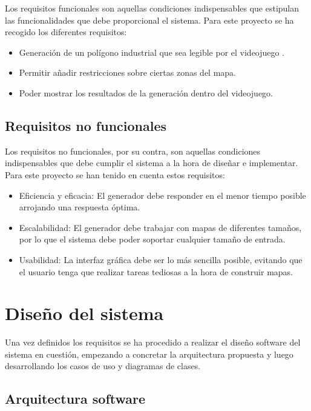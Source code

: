 Los requisitos funcionales son aquellas condiciones indispensables que estipulan las funcionalidades que debe proporcional el sistema. Para este proyecto se ha recogido los diferentes requisitos:

\begin{itemize}
	\item Generación de un polígono industrial que sea legible por el videojuego \cities.
	\item Permitir añadir restricciones sobre ciertas zonas del mapa.
	\item Poder mostrar los resultados de la generación dentro del videojuego.
\end{itemize}

\subsection{Requisitos no funcionales}

Los requisitos no funcionales, por su contra, son aquellas condiciones indispensables que debe cumplir el sistema a la hora de diseñar e implementar. Para este proyecto se han tenido en cuenta estos requisitos:

\begin{itemize}
	\item Eficiencia y eficacia: El generador debe responder en el menor tiempo posible arrojando una respuesta óptima.
	\item Escalabilidad: El generador debe trabajar con mapas de diferentes tamaños, por lo que el sistema debe poder soportar cualquier tamaño de entrada.
	\item Usabilidad: La interfaz gráfica debe ser lo más sencilla posible, evitando que el usuario tenga que realizar tareas tediosas a la hora de construir mapas.
\end{itemize}

\section{Diseño del sistema}

Una vez definidos los requisitos se ha procedido a realizar el diseño software del sistema en cuestión, empezando a concretar la arquitectura propuesta y luego desarrollando los casos de uso y diagramas de clases.

\subsection{Arquitectura software}
\label{subsec:arquitectura}

